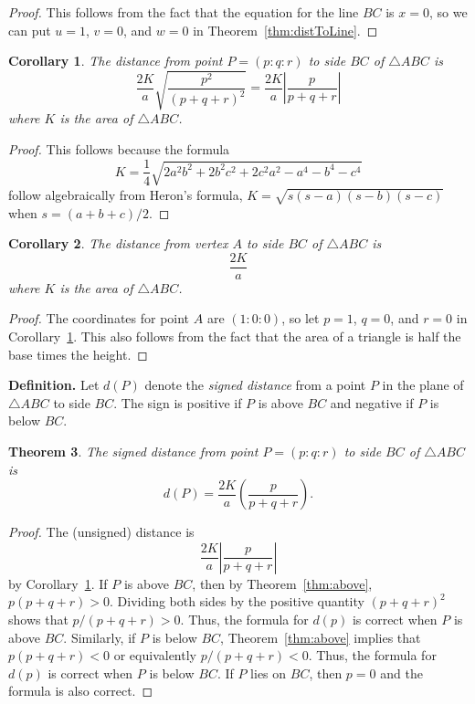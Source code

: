 \documentclass[12pt,a4paper]{amsart}
\newtheorem{theorem}{Theorem} [section]
\newtheorem{corollary}[theorem]{Corollary}
\begin{document}
\begin{proof}
This follows from the fact that the equation for the line $BC$ is $x=0$,
so we can put $u=1$, $v=0$, and $w=0$ in Theorem~\ref{thm:distToLine}.
\end{proof}

\begin{corollary}
\label{cor:distToLineK}
The distance from point $P=(p:q:r)$ to side $BC$ of $\triangle ABC$ is
$$\frac{2K}{a}\sqrt{\frac{p^2}{(p+q+r)^2}}=\frac{2K}{a}\left|\frac{p}{p+q+r}\right|$$
where $K$ is the area of $\triangle ABC$.
\end{corollary}

\begin{proof}
This follows because the formula
$$K=\frac{1}{4}\sqrt{2a^2b^2+2b^2c^2+2c^2a^2-a^4-b^4-c^4}$$
follow algebraically from Heron's formula, $K=\sqrt{s(s-a)(s-b)(s-c)}$ when
$s=(a+b+c)/2$.
\end{proof}

\begin{corollary}
The distance from vertex $A$ to side $BC$ of $\triangle ABC$ is
$$\frac{2K}{a}$$
where $K$ is the area of $\triangle ABC$.
\end{corollary}

\begin{proof}
The coordinates for point $A$ are $(1:0:0)$, so let $p=1$, $q=0$, and $r=0$ in Corollary~\ref{cor:distToLineK}.
This also follows from the fact that the area of a triangle is half the base times the height.
\end{proof}

\textbf{Definition.}
Let $d(P)$ denote the \emph{signed distance} from a point $P$ in the plane of $\triangle ABC$ to side $BC$.
The sign is positive if $P$ is above $BC$ and negative if $P$ is below $BC$.

\begin{theorem}
\label{thm:signedDistance}
The signed distance from point $P=(p:q:r)$ to side $BC$ of $\triangle ABC$ is
$$d(P)=\frac{2K}{a}\left(\frac{p}{p+q+r}\right).$$
\end{theorem}

\begin{proof}
The (unsigned) distance is
$$\frac{2K}{a}\left|\frac{p}{p+q+r}\right|$$
by Corollary~\ref{cor:distToLineK}.
If $P$ is above $BC$, then by Theorem~\ref{thm:above}, $p(p+q+r)>0$.
Dividing both sides by the positive quantity $(p+q+r)^2$ shows that $p/(p+q+r)>0$.
Thus, the formula for $d(p)$ is correct when $P$ is above $BC$. Similarly,
if $P$ is below $BC$, Theorem~\ref{thm:above} implies that $p(p+q+r)<0$
or equivalently $p/(p+q+r)<0$.
Thus, the formula for $d(p)$ is correct when $P$ is below $BC$.
If $P$ lies on $BC$, then $p=0$ and the formula is also correct.
\end{proof}
\end{document}
